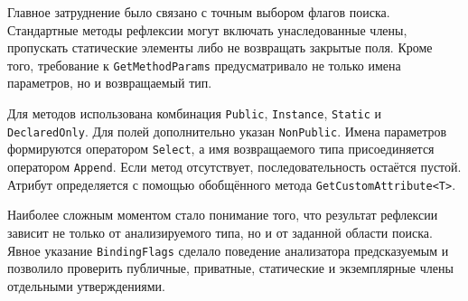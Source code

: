Главное затруднение было связано с точным выбором флагов поиска. Стандартные методы рефлексии могут включать унаследованные члены, пропускать статические элементы либо не возвращать закрытые поля. Кроме того, требование к \texttt{GetMethodParams} предусматривало не только имена параметров, но и возвращаемый тип.

Для методов использована комбинация \texttt{Public}, \texttt{Instance}, \texttt{Static} и \texttt{DeclaredOnly}. Для полей дополнительно указан \texttt{NonPublic}. Имена параметров формируются оператором \texttt{Select}, а имя возвращаемого типа присоединяется оператором \texttt{Append}. Если метод отсутствует, последовательность остаётся пустой. Атрибут определяется с помощью обобщённого метода \texttt{GetCustomAttribute<T>}.

Наиболее сложным моментом стало понимание того, что результат рефлексии зависит не только от анализируемого типа, но и от заданной области поиска. Явное указание \texttt{BindingFlags} сделало поведение анализатора предсказуемым и позволило проверить публичные, приватные, статические и экземплярные члены отдельными утверждениями.
